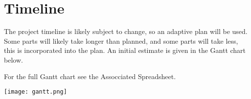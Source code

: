 \chapter{Timeline}
\graphicspath{ {./images/} }

\label{ch:timeline}

The project timeline is likely subject to change, so an adaptive plan will be used.
Some parts will likely take longer than planned, and some parts will take less,
this is incorporated into the plan. An initial estimate is given in the Gantt chart
below.

For the full Gantt chart see the Assocciated Spreadsheet.

\texttt{[image: gantt.png]}